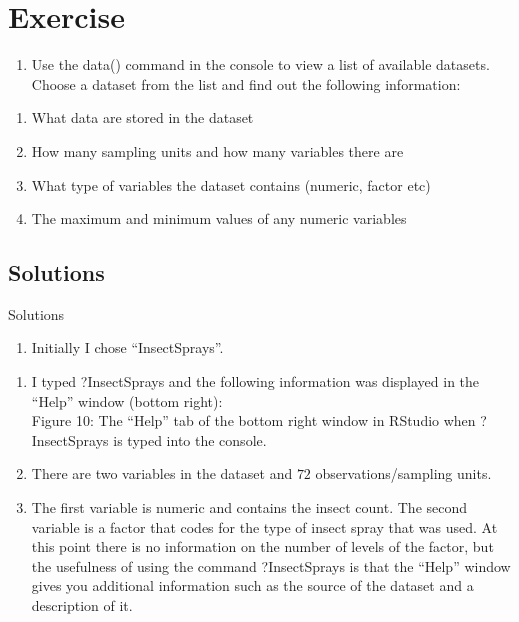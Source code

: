 \documentclass[
]{book}
\providecommand{\tightlist}{%
  \setlength{\itemsep}{0pt}\setlength{\parskip}{0pt}}
\begin{document}
\section{Exercise}\label{exercise-5}

\begin{enumerate}
\def\labelenumi{\arabic{enumi}.}
\tightlist
\item
  Use the data() command in the console to view a list of available datasets.\\
  Choose a dataset from the list and find out the following information:\\
\end{enumerate}

\begin{enumerate}
\def\labelenumi{\alph{enumi})}
\tightlist
\item
  What data are stored in the dataset\\
\item
  How many sampling units and how many variables there are\\
\item
  What type of variables the dataset contains (numeric, factor etc)\\
\item
  The maximum and minimum values of any numeric variables
\end{enumerate}

\subsection{Solutions}\label{solutions-5}

Solutions

\begin{enumerate}
\def\labelenumi{\arabic{enumi}.}
\tightlist
\item
  Initially I chose ``InsectSprays''.\\
\end{enumerate}

\begin{enumerate}
\def\labelenumi{\alph{enumi})}
\tightlist
\item
  I typed ?InsectSprays and the following information was displayed in the ``Help'' window (bottom right):\\

  Figure 10: The ``Help'' tab of the bottom right window in RStudio when ?InsectSprays is typed into the console.
\item
  There are two variables in the dataset and \(72\) observations/sampling units.\\
\item
  The first variable is numeric and contains the insect count. The second variable is a factor that codes for the type of insect spray that was used. At this point there is no information on the number of levels of the factor, but the usefulness of using the command ?InsectSprays is that the ``Help'' window gives you additional information such as the source of the dataset and a description of it.
\end{enumerate}
\end{document}
